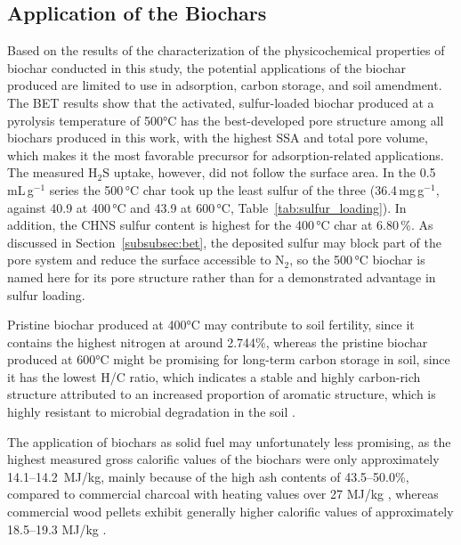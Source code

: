 \subsection{Application of the Biochars}
\label{subsec:utilization}
Based on the results of the characterization of the physicochemical properties of biochar conducted in this study, the potential applications of the biochar produced are limited to use in adsorption, carbon storage, and soil amendment. The BET results show that the activated, sulfur-loaded biochar produced at a pyrolysis temperature of 500°C has the best-developed pore structure among all biochars produced in this work, with the highest SSA and total pore volume, which makes it the most favorable precursor for adsorption-related applications. The measured H$_2$S uptake, however, did not follow the surface area. In the 0.5\,mL\,g$^{-1}$ series the 500\,°C char took up the least sulfur of the three (36.4\,mg\,g$^{-1}$, against 40.9 at 400\,°C and 43.9 at 600\,°C, Table~\ref{tab:sulfur_loading}). In addition, the CHNS sulfur content is highest for the 400\,°C char at 6.80\,\%. As discussed in Section~\ref{subsubsec:bet}, the deposited sulfur may block part of the pore system and reduce the surface accessible to N$_2$, so the 500\,°C biochar is named here for its pore structure rather than for a demonstrated advantage in sulfur loading.


\vspace{0.3em}

Pristine biochar produced at 400°C may contribute to soil fertility, since it contains the highest nitrogen at around 2.744\%, whereas the pristine biochar produced at 600°C might be promising for long-term carbon storage in soil, since it has the lowest H/C ratio, which indicates a stable and highly carbon-rich structure attributed to an increased proportion of aromatic structure, which is highly resistant to microbial degradation in the soil \cite{Li2023Biochar}. 

\vspace{0.3em}

The application of biochars as solid fuel may unfortunately less promising, as the highest measured gross calorific values of the biochars were only approximately 14.1--14.2~MJ/kg, mainly because of the high ash contents of 43.5--50.0\%, compared to commercial charcoal with heating values over 27 MJ/kg \parencite{Mencarelli2025Charcoal}, whereas commercial wood pellets exhibit generally higher calorific values of approximately 18.5--19.3 MJ/kg \parencite{Mack2025Pellets}.

